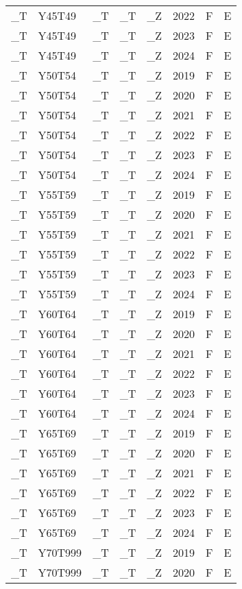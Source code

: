 \begin{longtable}[t]{llllllll}
\_T & Y45T49 & \_T & \_T & \_Z & 2022 & F & E\\
\_T & Y45T49 & \_T & \_T & \_Z & 2023 & F & E\\
\_T & Y45T49 & \_T & \_T & \_Z & 2024 & F & E\\
\addlinespace
\_T & Y50T54 & \_T & \_T & \_Z & 2019 & F & E\\
\_T & Y50T54 & \_T & \_T & \_Z & 2020 & F & E\\
\_T & Y50T54 & \_T & \_T & \_Z & 2021 & F & E\\
\_T & Y50T54 & \_T & \_T & \_Z & 2022 & F & E\\
\_T & Y50T54 & \_T & \_T & \_Z & 2023 & F & E\\
\addlinespace
\_T & Y50T54 & \_T & \_T & \_Z & 2024 & F & E\\
\_T & Y55T59 & \_T & \_T & \_Z & 2019 & F & E\\
\_T & Y55T59 & \_T & \_T & \_Z & 2020 & F & E\\
\_T & Y55T59 & \_T & \_T & \_Z & 2021 & F & E\\
\_T & Y55T59 & \_T & \_T & \_Z & 2022 & F & E\\
\addlinespace
\_T & Y55T59 & \_T & \_T & \_Z & 2023 & F & E\\
\_T & Y55T59 & \_T & \_T & \_Z & 2024 & F & E\\
\_T & Y60T64 & \_T & \_T & \_Z & 2019 & F & E\\
\_T & Y60T64 & \_T & \_T & \_Z & 2020 & F & E\\
\_T & Y60T64 & \_T & \_T & \_Z & 2021 & F & E\\
\addlinespace
\_T & Y60T64 & \_T & \_T & \_Z & 2022 & F & E\\
\_T & Y60T64 & \_T & \_T & \_Z & 2023 & F & E\\
\_T & Y60T64 & \_T & \_T & \_Z & 2024 & F & E\\
\_T & Y65T69 & \_T & \_T & \_Z & 2019 & F & E\\
\_T & Y65T69 & \_T & \_T & \_Z & 2020 & F & E\\
\addlinespace
\_T & Y65T69 & \_T & \_T & \_Z & 2021 & F & E\\
\_T & Y65T69 & \_T & \_T & \_Z & 2022 & F & E\\
\_T & Y65T69 & \_T & \_T & \_Z & 2023 & F & E\\
\_T & Y65T69 & \_T & \_T & \_Z & 2024 & F & E\\
\_T & Y70T999 & \_T & \_T & \_Z & 2019 & F & E\\
\addlinespace
\_T & Y70T999 & \_T & \_T & \_Z & 2020 & F & E\\

\end{longtable}
